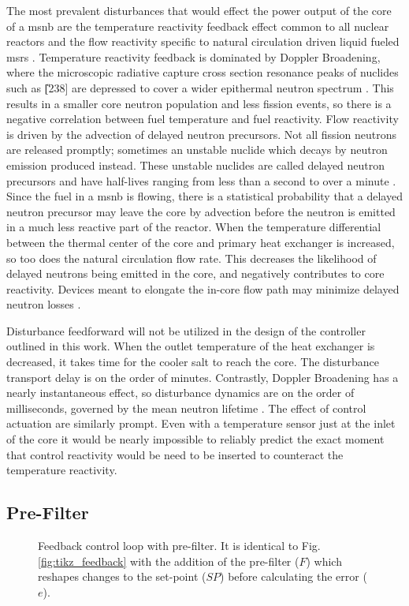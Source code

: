 The most prevalent disturbances that would effect the power output of the core of a \acs{msnb} are the temperature reactivity feedback effect common to all nuclear reactors and the flow reactivity specific to natural circulation driven  liquid fueled \acsp{msr} \cite{CarterNumerical}. Temperature reactivity feedback is dominated by Doppler Broadening, where the microscopic radiative capture cross section resonance peaks of nuclides such as \U[238] are depressed to cover a wider epithermal neutron spectrum \cite[Ch. 6]{DH}. This results in a smaller core neutron population and less fission events, so there is a negative correlation between fuel temperature and fuel reactivity. Flow reactivity is driven by the advection of delayed neutron precursors. Not all fission neutrons are released promptly; sometimes an unstable nuclide which decays by neutron emission produced instead. These unstable nuclides are called delayed neutron precursors and have half-lives ranging from less than a second to over a minute \cite[Ch. 7]{Lamarsh}. Since the fuel in a \acs{msnb} is flowing, there is a statistical probability that a delayed neutron precursor may leave the core by advection before the neutron is emitted in a much less reactive part of the reactor. When the temperature differential between the thermal center of the core and primary heat exchanger is increased, so too does the natural circulation flow rate. This decreases the likelihood of delayed neutrons being emitted in the core, and negatively contributes to core reactivity. Devices meant to elongate the in-core flow path may minimize delayed neutron losses \cite{CarterPHD}.

Disturbance feedforward will not be utilized in the design of the controller outlined in this work. When the outlet temperature of the heat exchanger is decreased, it takes time for the cooler salt to reach the core. The disturbance transport delay is on the order of minutes. Contrastly, Doppler Broadening has a nearly instantaneous effect, so disturbance dynamics are on the order of milliseconds, governed by the mean neutron lifetime \cite[Ch. 7]{Lamarsh}. The effect of control actuation are similarly prompt. Even with a temperature sensor just at the inlet of the core it would be nearly impossible to reliably predict the exact moment that control reactivity would be need to be inserted to counteract the temperature reactivity. 

\subsection{Pre-Filter}
\begin{figure}[h!]
    \centering
    
    \caption[Feedback control loop with pre-filter]{Feedback control loop with pre-filter. It is identical to Fig. \ref{fig:tikz_feedback} with the addition of the pre-filter ($F$) which reshapes changes to the set-point ($SP$) before calculating the error ($e$).}
    \label{fig:tikz_prefilter}
\end{figure}

